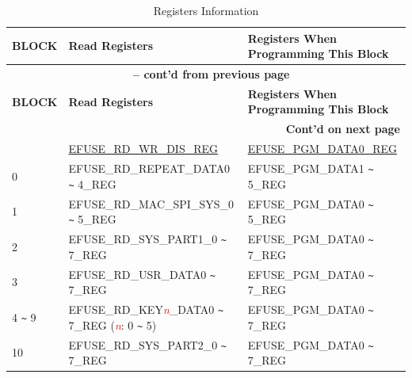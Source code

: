 \begin{longtable}[c]{|l|l|l|}
\caption{Registers Information}
\label{tab:efuse-softw-read-para}
    \\\hline
    \rowcolor{lightgray}
        \textbf{BLOCK} & \textbf{Read Registers} & \textbf{Registers When Programming This Block}\\
    \endfirsthead
    
    \multicolumn{3}{c}{\bfseries \tablename\ \thetable{} -- cont'd from previous page}\\\hline
    
    \rowcolor{lightgray}
        \textbf{BLOCK} & \textbf{Read Registers} & \textbf{Registers When Programming This Block}\\
    \endhead
    
    \multicolumn{3}{r}{\textbf{Cont'd on next page}} \\
    \endfoot
    \endlastfoot
    \hline
0 & \hyperref[regdesc:EFUSERDWRDISREG]{EFUSE\_RD\_WR\_DIS\_REG} & \hyperref[regdesc:EFUSEPGMDATA0REG]{EFUSE\_PGM\_DATA0\_REG} \\\hline
0 & EFUSE\_RD\_REPEAT\_DATA0 \verb+~+ 4\_REG & EFUSE\_PGM\_DATA1 \verb+~+ 5\_REG \\\hline
1 & EFUSE\_RD\_MAC\_SPI\_SYS\_0 \verb+~+ 5\_REG & EFUSE\_PGM\_DATA0 \verb+~+ 5\_REG \\\hline
2 & EFUSE\_RD\_SYS\_PART1\_0 \verb+~+ 7\_REG & EFUSE\_PGM\_DATA0 \verb+~+ 7\_REG \\\hline
3 & EFUSE\_RD\_USR\_DATA0 \verb+~+ 7\_REG & EFUSE\_PGM\_DATA0 \verb+~+ 7\_REG \\ \hline
4 \Verb+~+ 9 & EFUSE\_RD\_KEY\textcolor{red}{\it{n}}\_DATA0 \verb+~+ 7\_REG (\textcolor{red}{\it{n}}: 0 \verb+~+ 5) & EFUSE\_PGM\_DATA0 \verb+~+ 7\_REG \\\hline
10 & EFUSE\_RD\_SYS\_PART2\_0 \verb+~+ 7\_REG & EFUSE\_PGM\_DATA0 \verb+~+ 7\_REG \\\hline
\end{longtable}
